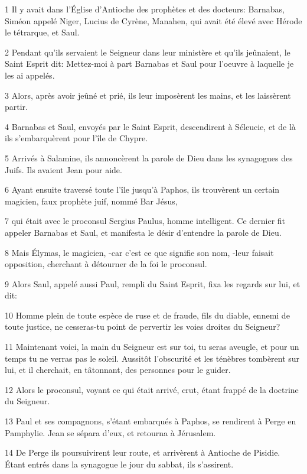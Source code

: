 \par 1 Il y avait dans l'Église d'Antioche des prophètes et des docteurs: Barnabas, Siméon appelé Niger, Lucius de Cyrène, Manahen, qui avait été élevé avec Hérode le tétrarque, et Saul.
\par 2 Pendant qu'ils servaient le Seigneur dans leur ministère et qu'ils jeûnaient, le Saint Esprit dit: Mettez-moi à part Barnabas et Saul pour l'oeuvre à laquelle je les ai appelés.
\par 3 Alors, après avoir jeûné et prié, ils leur imposèrent les mains, et les laissèrent partir.
\par 4 Barnabas et Saul, envoyés par le Saint Esprit, descendirent à Séleucie, et de là ils s'embarquèrent pour l'île de Chypre.
\par 5 Arrivés à Salamine, ils annoncèrent la parole de Dieu dans les synagogues des Juifs. Ils avaient Jean pour aide.
\par 6 Ayant ensuite traversé toute l'île jusqu'à Paphos, ils trouvèrent un certain magicien, faux prophète juif, nommé Bar Jésus,
\par 7 qui était avec le proconsul Sergius Paulus, homme intelligent. Ce dernier fit appeler Barnabas et Saul, et manifesta le désir d'entendre la parole de Dieu.
\par 8 Mais Élymas, le magicien, -car c'est ce que signifie son nom, -leur faisait opposition, cherchant à détourner de la foi le proconsul.
\par 9 Alors Saul, appelé aussi Paul, rempli du Saint Esprit, fixa les regards sur lui, et dit:
\par 10 Homme plein de toute espèce de ruse et de fraude, fils du diable, ennemi de toute justice, ne cesseras-tu point de pervertir les voies droites du Seigneur?
\par 11 Maintenant voici, la main du Seigneur est sur toi, tu seras aveugle, et pour un temps tu ne verras pas le soleil. Aussitôt l'obscurité et les ténèbres tombèrent sur lui, et il cherchait, en tâtonnant, des personnes pour le guider.
\par 12 Alors le proconsul, voyant ce qui était arrivé, crut, étant frappé de la doctrine du Seigneur.
\par 13 Paul et ses compagnons, s'étant embarqués à Paphos, se rendirent à Perge en Pamphylie. Jean se sépara d'eux, et retourna à Jérusalem.
\par 14 De Perge ils poursuivirent leur route, et arrivèrent à Antioche de Pisidie. Étant entrés dans la synagogue le jour du sabbat, ils s'assirent.
